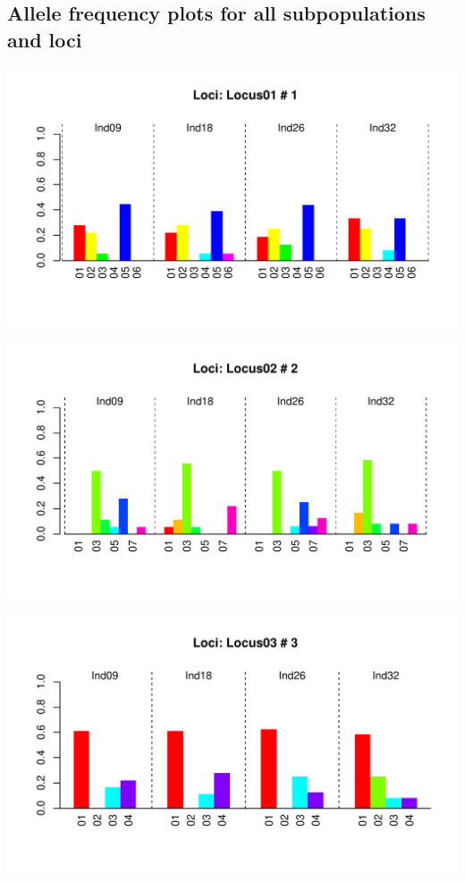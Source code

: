 \documentclass[a4paper]{scrartcl}\usepackage[]{graphicx}\usepackage[]{color}
\makeatletter
\def\maxwidth{ %
  \ifdim\Gin@nat@width>\linewidth
    \linewidth
  \else
    \Gin@nat@width
  \fi
}
\newenvironment{knitrout}{}{} %
\makeatother
\begin{document}
\subsection{Allele frequency plots for all subpopulations and loci}


\FloatBarrier
\begin{knitrout}
\color{fgcolor}
\includegraphics[width=\maxwidth]{PopGenReport-allelfreq-1} 

\includegraphics[width=\maxwidth]{PopGenReport-allelfreq-2} 

\includegraphics[width=\maxwidth]{PopGenReport-allelfreq-3} 


\end{knitrout}
\end{document}
